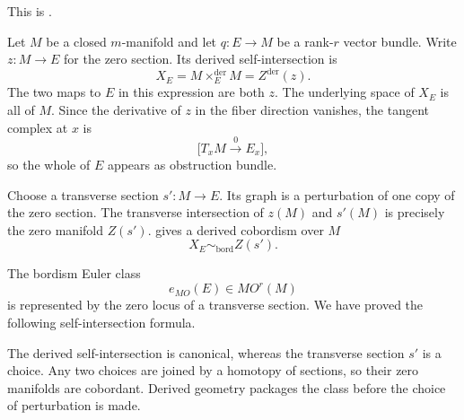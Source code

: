 This is \citet[Corollary~3.13]{Spivak_Derived_Smooth_Manifolds}.

Let $M$ be a closed $m$-manifold and let $q\colon E\to M$ be a rank-$r$
vector bundle. Write $z\colon M\to E$ for the zero section. Its derived
self-intersection is
\[
  X_E
  =
  M\mathbin{\times_E^{\mathrm{der}}}M
  =
  Z^{\mathrm{der}}(z).
\]
The two maps to $E$ in this expression are both $z$. The underlying space
of $X_E$ is all of $M$. Since the derivative of $z$ in the fiber direction
vanishes, the tangent complex at $x$ is
\[
  \bigl[T_xM\xrightarrow{\;0\;}E_x\bigr],
\]
so the whole of $E$ appears as obstruction bundle.

Choose a transverse section $s'\colon M\to E$. Its graph is a perturbation of
one copy of the zero section. The transverse intersection of $z(M)$ and
$s'(M)$ is precisely the zero manifold $Z(s')$.
 gives a derived cobordism
over $M$
\[
  X_E
  \sim_{\mathrm{bord}}
  Z(s').
\]

The bordism Euler class
\[
  e_{MO}(E)\in MO^r(M)
\]
is represented by the zero locus of a transverse section. We have proved the
following self-intersection formula.


The derived self-intersection is canonical, whereas the transverse section
$s'$ is a choice. Any two choices are joined by a homotopy of sections, so
their zero manifolds are cobordant. Derived geometry packages the class before
the choice of perturbation is made.


